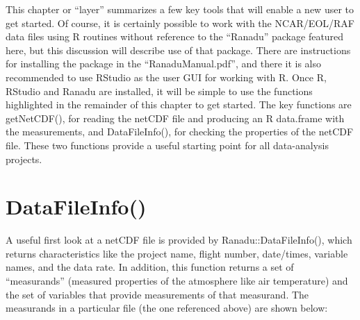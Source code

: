 \documentclass[12pt,english]{report}\usepackage[]{graphicx}\usepackage[]{color}
\begin{document}
This chapter or ``layer'' summarizes a few key tools that will enable
a new user to get started. Of course, it is certainly possible to
work with the NCAR/EOL/RAF data files using R routines without reference
to the ``Ranadu'' package featured here, but this discussion will
describe use of that package. There are instructions for installing
the package in the ``RanaduManual.pdf'', and there it is also recommended
to use RStudio as the user GUI for working with R\@. Once R, RStudio
and Ranadu are installed, it will be simple to use the functions highlighted
in the remainder of this chapter to get started. The key functions
are getNetCDF(), for reading the netCDF file and producing an R data.frame
with the measurements, and DataFileInfo(), for checking the properties
of the netCDF file. These two functions provide a useful starting
point for all data-analysis projects.

\section{DataFileInfo()}

A useful first look at a netCDF file is provided by Ranadu::DataFileInfo(),
which returns characteristics like the project name, flight number,
date/times, variable names, and the data rate. In addition, this function
returns a set of ``measurands'' (measured properties of the atmosphere
like air temperature) and the set of variables that provide measurements
of that measurand. The measurands in a particular file (the one referenced
above) are shown below:
\end{document}
